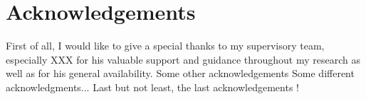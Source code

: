 \chapter{Acknowledgements}

First of all, I would like to give a special thanks to my supervisory team, especially XXX for his valuable support and guidance throughout my research as well as for his general availability.
\bigbreak
Some other acknowledgements
\bigbreak
Some different acknowledgments...
\bigbreak
Last but not least, the last acknowledgements !
